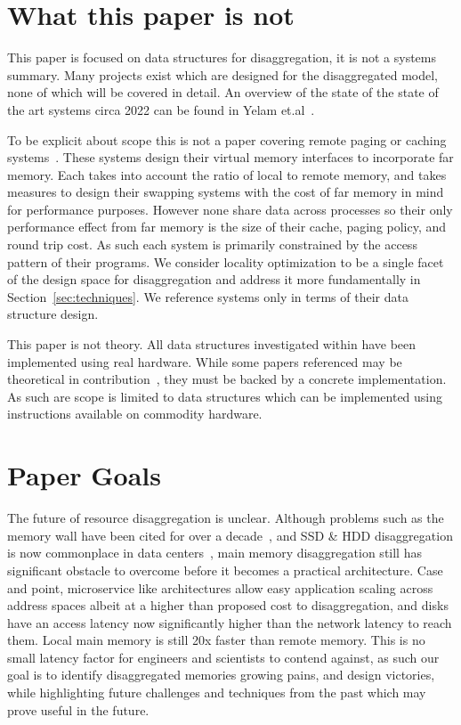 \section{What this paper is not}
\label{sec:not}

This paper is focused on data structures for disaggregation, it is not a systems
summary.  Many projects exist which are designed for the disaggregated model,
none of which will be covered in detail. An overview of the state of the state
of the art systems circa 2022 can be found in Yelam
et.al~\cite{yelam2022systems}.

To be explicit about scope this is not a paper covering remote paging or caching
systems~\cite{fastswap,kona,infiniswap,leap,legoos}. These systems design their
virtual memory interfaces to incorporate far memory. Each takes into account the
ratio of local to remote memory, and takes measures to design their swapping
systems with the cost of far memory in mind for performance purposes.  However
none share data across processes so their only performance effect from far
memory is the size of their cache, paging policy, and round trip cost. As such
each system is primarily constrained by the access pattern of their programs. We
consider locality optimization to be a single facet of the design space for
disaggregation and address it more fundamentally in
Section~\ref{sec:techniques}. We reference systems only in terms of their data
structure design.

This paper is not theory. All data structures investigated within have been
implemented using real hardware. While some papers referenced may be theoretical
in contribution~\cite{flat-combine,hopscotch,linked-list-cas}, they must be
backed by a concrete implementation. As such are scope is limited to data
structures which can be implemented using instructions available on commodity
hardware.

\section{Paper Goals}

The future of resource disaggregation is unclear. Although problems such as the
memory wall have been cited for over a decade~\cite{blade-server}, and SSD \&
HDD disaggregation is now commonplace in data centers~\cite{decible}, main
memory disaggregation still has significant obstacle to overcome before it
becomes a practical architecture. Case and point, microservice like
architectures allow easy application scaling across address spaces albeit at a
higher than proposed cost to disaggregation, and disks have an access latency
now significantly higher than the network latency to reach them. Local main
memory is still 20x faster than remote memory. This is no small latency factor
for engineers and scientists to contend against, as such our goal is to identify
disaggregated memories growing pains, and design victories, while highlighting
future challenges and techniques from the past which may prove useful in the
future.

